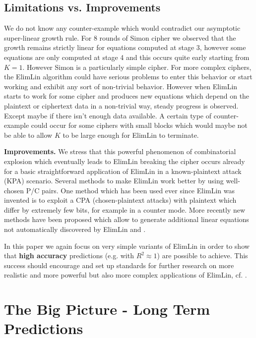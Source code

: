 \subsection{Limitations vs. Improvements}

We do not know any %
counter-example which would contradict our asymptotic super-linear growth rule.
For 8 rounds of Simon cipher we observed that the growth remains strictly linear for
equations computed at stage 3, however some equations are only computed at stage 4
and this occurs quite early starting from $K=1$.
However Simon is a particularly simple cipher. For more complex ciphers,
the ElimLin algorithm could have serious problems to enter this behavior
or start working and exhibit any sort of non-trivial behavior.
However when ElimLin starts to work for some cipher and produces new equations
which depend on the plaintext or ciphertext data in a non-trivial way,
steady progress is observed.
Except maybe if there isn't enough data available.
A certain type of counter-example could occur for some ciphers
with small blocks which
would maybe not be able to allow $K$ to be large enough for ElimLin to terminate.

{\bf Improvements.}
We stress that this powerful phenomenon of combinatorial explosion which eventually leads
to ElimLin breaking the cipher
occurs already for a basic straightforward application of ElimLin in a
known-plaintext attack (KPA) scenario.
Several methods to make ElimLin work better by using
well-chosen P/C pairs.
One method which has been used ever since ElimLin was invented \cite{FastAlg,FastAlg2,desalg}
is to exploit a CPA (chosen-plaintext attacks) with plaintext which differ by extremely few bits, for example in a counter mode.
More recently new methods have been proposed
which allow to generate additional linear equations
not automatically discovered by ElimLin
\cite{ACTruncSimon} and \cite{ElimLinUniversalEqs}.

In this paper we again focus on very simple variants of ElimLin in order to show that
{\bf high accuracy} predictions (e.g. with $R^2\approx 1$) are possible to achieve.
This success should encourage and set up standards for further research
on more realistic and more powerful but also more complex applications of ElimLin, cf.
\cite{ACTruncSimon,ElimLinUniversalEqs,RaddumSimon}.


\section{The Big Picture - Long Term Predictions}
\label{BigPictureUpAndDown}

